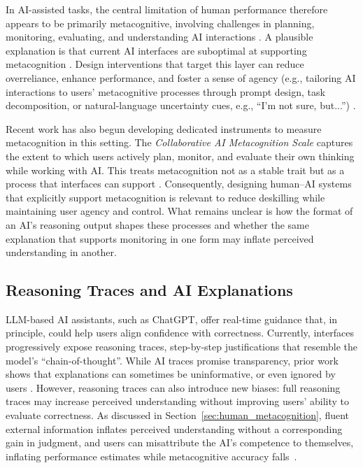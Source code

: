 \documentclass[manuscript, anonymous=false,authorversion,review=false]{acmart}
\begin{document}
In AI-assisted tasks, the central limitation of human performance therefore appears to be primarily metacognitive, involving challenges in planning, monitoring, evaluating, and understanding AI interactions \cite{tankelevitch2023metacognitive}. A plausible explanation is that current AI interfaces are suboptimal at supporting metacognition \cite{ramesh2026metacognitive}. Design interventions that target this layer can reduce overreliance, enhance performance, and foster a sense of agency (e.g., tailoring AI interactions to users' metacognitive processes through prompt design, task decomposition, or natural-language uncertainty cues, e.g., ``I'm not sure, but...'') \cite{tankelevitch2023metacognitive, draxlerghost24, kim2024m}. 

Recent work has also begun developing dedicated instruments to measure metacognition in this setting. The \textit{Collaborative AI Metacognition Scale} captures the extent to which users actively plan, monitor, and evaluate their own thinking while working with AI. This treats metacognition not as a stable trait but as a process that interfaces can support \cite{Sidra03042026}. Consequently, designing human–AI systems that explicitly support metacognition is relevant to reduce deskilling while maintaining user agency and control. What remains unclear is how the format of an AI's reasoning output shapes these processes and whether the same explanation that supports monitoring in one form may inflate perceived understanding in another.

\subsection{Reasoning Traces and AI Explanations}
LLM-based AI assistants, such as ChatGPT, offer real-time guidance that, in principle, could help users align confidence with correctness. 
Currently, interfaces progressively expose reasoning traces, step-by-step justifications that resemble the model's ``chain-of-thought''. While AI traces promise transparency, prior work shows that explanations can sometimes be uninformative, or even ignored by users \cite{vasconcelos2023explanations, wang2021explanations}. However, reasoning traces can also introduce new biases: full reasoning traces may increase perceived understanding without improving users' ability to evaluate correctness. As discussed in Section~\ref{sec:human_metacognition}, fluent external information inflates perceived understanding without a corresponding gain in judgment, and users can misattribute the AI's competence to themselves, inflating performance estimates while metacognitive accuracy falls~\cite{tankelevitch2023metacognitive}.
\end{document}
